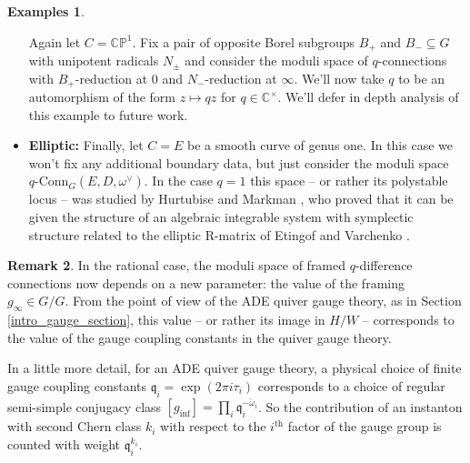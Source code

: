 \documentclass[11pt, oneside, reqno]{amsart}
\theoremstyle{definition} \newtheorem{definition}{Definition}[section]
\theoremstyle{definition} \newtheorem{remark}[definition]{Remark}
\theoremstyle{definition} \newtheorem{remarks}[definition]{Remarks}
\theoremstyle{definition} \newtheorem{question}[definition]{Question}
\theoremstyle{definition} \newtheorem*{note}{Note}
\theoremstyle{definition} \newtheorem{example}[definition]{Example}
\theoremstyle{definition} \newtheorem{examples}[definition]{Examples}
\newcommand{\bb}[1]{\mathbb{#1}}
\newcommand{\CC}{\mathbb{C}}
\newcommand{\sub}{\subseteq}
\newcommand{\qconn}{q\text{-Conn}}
\begin{document}
\begin{examples}
\begin{itemize}
  Again let $C = \bb{CP}^1$.  Fix a pair of opposite Borel subgroups $B_+$ and $B_- \sub G$ with unipotent radicals $N_\pm$ and consider the moduli space of $q$-connections with $B_+$-reduction at $0$ and $N_-$-reduction at $\infty$.  We'll now take $q$ to be an automorphism of the form $z \mapsto qz$ for $q \in \CC^\times$.  We'll defer in depth analysis of this example to future work.
  
  \item \textbf{Elliptic:} Finally, let $C = E$ be a smooth curve of genus one.  In this case we won't fix any additional boundary data, but just consider the moduli space $\qconn_G(E,D, \omega^\vee)$.  In the case $q = 1$ this space -- or rather its polystable locus -- was studied by Hurtubise and Markman \cite{HurtubiseMarkman}, who proved that it can be given the structure of an algebraic integrable system with symplectic structure related to the elliptic R-matrix of Etingof and Varchenko \cite{EtingofVarchenko}.
 \end{itemize}
\end{examples}

\begin{remark}
In the rational case, the moduli space of framed $q$-difference connections now depends on a new parameter: the value of the framing $g_\infty \in G/G$.  From the point of view of the ADE quiver gauge theory, as in Section \ref{intro_gauge_section}, this value -- or rather its image in $H/W$ -- corresponds to the value of the gauge coupling constants in the quiver gauge theory.

In a little more detail, for an ADE quiver gauge theory, a physical choice of finite gauge coupling constants $\mathfrak{q}_i = \exp (2 \pi i \tau_i)$ corresponds to a choice of regular semi-simple conjugacy class $[g_{\inf}]  = \prod_{i} \mathfrak{q}_{i}^{-\check \omega_i}$.  So the contribution of an instanton with second Chern class $k_i$ with respect to the $i^{\text{th}}$ factor of the gauge group is counted with weight $\mathfrak{q}_{i}^{k_i}$.
\end{remark}
\end{document}
